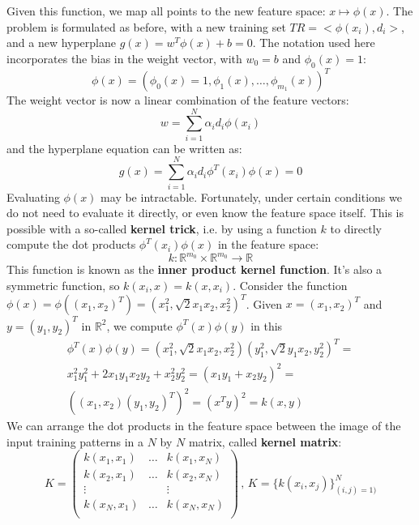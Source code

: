 Given this function, we map all points to the new feature space: $x \mapsto \phi(x)$. The problem is formulated as before, with a new training set $TR = < \phi(x_i),d_i >$, and a new hyperplane $g(x) = w^T \phi(x) + b = 0$. The notation used here incorporates the bias in the weight vector, with $w_0 = b$ and $\phi_0(x) = 1$:
\begin{equation*}
    \phi(x) = (\phi_0(x) = 1, \phi_1(x), \dots , \phi_{m_1}(x))^T
\end{equation*}
The weight vector is now a linear combination of the feature vectors:
\begin{equation*}
    w = \sum_{i=1}^N \alpha_i d_i \phi(x_i)
\end{equation*}
and the hyperplane equation can be written as:
\begin{equation*}
    g(x) = \sum_{i=1}^N \alpha_i d_i \phi^T (x_i) \phi(x) = 0
\end{equation*}
Evaluating $\phi(x)$ may be intractable. Fortunately, under certain conditions we do not need to evaluate it directly, or even know the feature space itself. This is possible with a so-called \textbf{kernel trick}, i.e. by using a function $k$ to directly compute the dot products $\phi^T (x_i) \phi(x)$ in the feature space:
\begin{equation*}
    k : \mathbb{R}^{m_0} \times \mathbb{R}^{m_0} \xrightarrow{} \mathbb{R}
\end{equation*}
This function is known as the \textbf{inner product kernel function}. It's also a symmetric function, so $k(x_i, x) = k(x, x_i)$. Consider the function $\phi(x) = \phi((x_1, x_2)^T) = (x_1^2, \sqrt{2}x_1x_2, x_2^2)^T$. Given $x = (x_1, x_2)^T$ and $y=(y_1,y_2)^T$ in $\mathbb{R}^2$, we compute $\phi^T(x)\phi(y)$ in this 
\begin{gather*}
    \phi^T(x)\phi(y) = (x_1^2, \sqrt{2}x_1x_2, x_2^2) (y_1^2, \sqrt{2}y_1x_2, y_2^2)^T = \\
    x_1^2y_1^2 + 2x_1y_1x_2y_2 + x_2^2y_2^2 = (x_1y_1 + x_2y_2)^2 = \\
    ((x_1,x_2)(y_1,y_2)^T)^2 = (x^Ty)^2 = k(x,y)
\end{gather*}
We can arrange the dot products in the feature space between the image of the input training patterns in a $N$ by $N$ matrix, called \textbf{kernel matrix}:
\begin{equation*}
    K = \begin{pmatrix}
        k(x_1,x_1) & \dots & k(x_1, x_N) \\
        k(x_2,x_1) & \dots & k(x_2, x_N) \\
        \vdots & & \vdots \\
        k(x_N,x_1) & \dots & k(x_N, x_N) \\
        \end{pmatrix} \,, \,
        K = \{k(x_i, x_j)\}_{(i,j)=1)}^N
\end{equation*}
